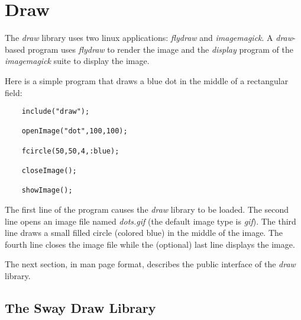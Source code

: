 \section{Draw}

The {\it draw} library uses two linux applications:
{\it flydraw} and {\it imagemagick}.
A {\it draw}-based program uses {\it flydraw} to render the image
and the {\it display}
program of the {\it imagemagick} suite
to display the image.

Here is a simple program that draws a blue dot in the
middle of a rectangular field:

\color{CodeGreen}
\begin{codesize}
\begin{verbatim}
    include("draw");

    openImage("dot",100,100);

    fcircle(50,50,4,:blue);

    closeImage();

    showImage();
\end{verbatim}
\end{codesize}
\color{black}

The first line of the program causes the {\it draw} library to be loaded.
The second line opens an image file named {\it dots.gif}
(the default image type is {\it gif}).
The third line draws a small filled circle (colored blue) in the middle
of the image. The fourth line closes the image file while the
(optional) last line
displays the image.

The next section, in man page format, describes the public interface
of the {\it draw} library.

\subsection*{The Sway Draw Library}


